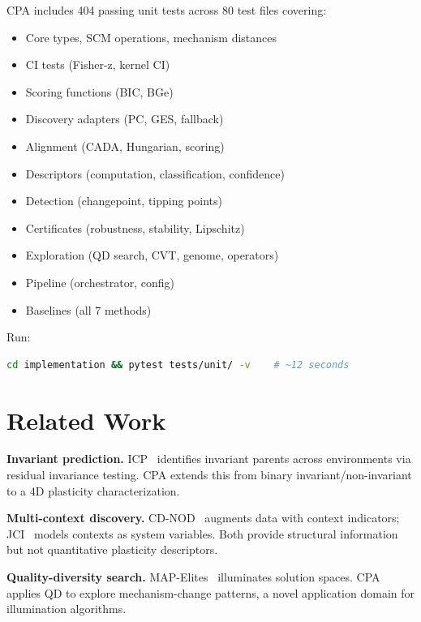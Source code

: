 \documentclass[11pt]{article}
\newcommand{\cpa}{\textsc{CPA}}
\begin{document}
\cpa{} includes 404 passing unit tests across 80 test files covering:
\begin{itemize}[nosep]
  \item Core types, SCM operations, mechanism distances
  \item CI tests (Fisher-z, kernel CI)
  \item Scoring functions (BIC, BGe)
  \item Discovery adapters (PC, GES, fallback)
  \item Alignment (CADA, Hungarian, scoring)
  \item Descriptors (computation, classification, confidence)
  \item Detection (changepoint, tipping points)
  \item Certificates (robustness, stability, Lipschitz)
  \item Exploration (QD search, CVT, genome, operators)
  \item Pipeline (orchestrator, config)
  \item Baselines (all 7 methods)
\end{itemize}

Run:
\begin{lstlisting}[language=bash]
cd implementation && pytest tests/unit/ -v    # ~12 seconds
\end{lstlisting}

\section{Related Work}

\textbf{Invariant prediction.}
ICP~\cite{peters2016} identifies invariant parents across environments
via residual invariance testing. \cpa{} extends this from binary
invariant/non-invariant to a 4D plasticity characterization.

\textbf{Multi-context discovery.}
CD-NOD~\cite{zhang2017} augments data with context indicators; JCI~\cite{mooij2020}
models contexts as system variables. Both provide structural
information but not quantitative plasticity descriptors.

\textbf{Quality-diversity search.}
MAP-Elites~\cite{mouret2015} illuminates solution spaces.
\cpa{} applies QD to explore mechanism-change patterns,
a novel application domain for illumination algorithms.

\end{document}
